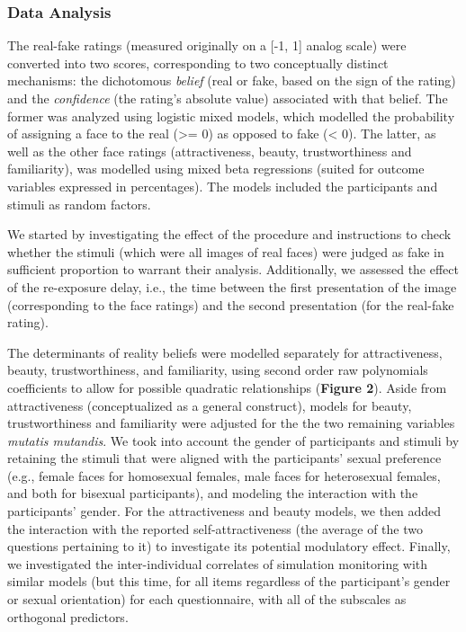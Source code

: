 \documentclass[
  man,floatsintext]{apa6}
\begin{document}
\hypertarget{data-analysis}{%
\subsubsection{Data Analysis}\label{data-analysis}}

The real-fake ratings (measured originally on a {[}-1, 1{]} analog scale) were converted into two scores, corresponding to two conceptually distinct mechanisms: the dichotomous \emph{belief} (real or fake, based on the sign of the rating) and the \emph{confidence} (the rating's absolute value) associated with that belief. The former was analyzed using logistic mixed models, which modelled the probability of assigning a face to the real (\textgreater= 0) as opposed to fake (\textless{} 0). The latter, as well as the other face ratings (attractiveness, beauty, trustworthiness and familiarity), was modelled using mixed beta regressions (suited for outcome variables expressed in percentages). The models included the participants and stimuli as random factors.

We started by investigating the effect of the procedure and instructions to check whether the stimuli (which were all images of real faces) were judged as fake in sufficient proportion to warrant their analysis. Additionally, we assessed the effect of the re-exposure delay, i.e., the time between the first presentation of the image (corresponding to the face ratings) and the second presentation (for the real-fake rating).

The determinants of reality beliefs were modelled separately for attractiveness, beauty, trustworthiness, and familiarity, using second order raw polynomials coefficients to allow for possible quadratic relationships (\textbf{Figure 2}). Aside from attractiveness (conceptualized as a general construct), models for beauty, trustworthiness and familiarity were adjusted for the the two remaining variables \emph{mutatis mutandis}. We took into account the gender of participants and stimuli by retaining the stimuli that were aligned with the participants' sexual preference (e.g., female faces for homosexual females, male faces for heterosexual females, and both for bisexual participants), and modeling the interaction with the participants' gender. For the attractiveness and beauty models, we then added the interaction with the reported self-attractiveness (the average of the two questions pertaining to it) to investigate its potential modulatory effect. Finally, we investigated the inter-individual correlates of simulation monitoring with similar models (but this time, for all items regardless of the participant's gender or sexual orientation) for each questionnaire, with all of the subscales as orthogonal predictors.
\end{document}
